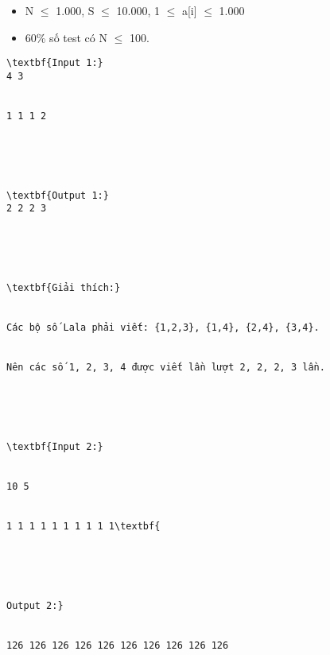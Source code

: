 \begin{itemize}
	\item     N  $\le$  1.000, S  $\le$  10.000, 1 $\le$  a[i]  $\le$  1.000   
	\item     60\% số test có N  $\le$  100.   
\end{itemize}
\begin{verbatim}
\textbf{Input 1:}
4 3


1 1 1 2





\textbf{Output 1:}
2 2 2 3 





\textbf{Giải thích:}


Các bộ số Lala phải viết: {1,2,3}, {1,4}, {2,4}, {3,4}. 


Nên các số 1, 2, 3, 4 được viết lần lượt 2, 2, 2, 3 lần.





\textbf{Input 2:}


10 5


1 1 1 1 1 1 1 1 1 1\textbf{





Output 2:}


126 126 126 126 126 126 126 126 126 126 \end{verbatim}